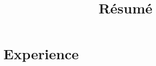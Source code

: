 \documentclass[11.5pt,a4paper,sans]{moderncv}        %
\title{R\'{e}sum\'{e}}                               %
\begin{document}
\makecvtitle



\section{Experience}
\end{document}
